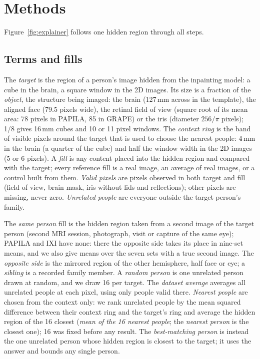 \section{Methods}
\label{sec:methods}

Figure~\ref{fig:explainer} follows one hidden region through all steps.

\subsection{Terms and fills}
\label{sec:ladder}
\label{sec:controls}
The \emph{target} is the region of a person's image hidden from the inpainting model: a cube in the brain, a square window in the 2D images.
Its size is a fraction of the \emph{object}, the structure being imaged: the brain (127\,mm across in the template), the aligned face (79.5 pixels wide), the retinal field of view (square root of its mean area: 78 pixels in PAPILA, 85 in GRAPE) or the iris (diameter $256/\pi$ pixels); 1/8 gives 16\,mm cubes and 10 or 11 pixel windows.
The \emph{context ring} is the band of visible pixels around the target that is used to choose the nearest people: 4\,mm in the brain (a quarter of the cube) and half the window width in the 2D images (5 or 6 pixels).
A \emph{fill} is any content placed into the hidden region and compared with the target; every reference fill is a real image, an average of real images, or a control built from them.
\emph{Valid pixels} are pixels observed in both target and fill (field of view, brain mask, iris without lids and reflections); other pixels are missing, never zero.
\emph{Unrelated people} are everyone outside the target person's family.

The \emph{same person} fill is the hidden region taken from a second image of the target person (second \ac{MRI} session, photograph, visit or capture of the same eye); PAPILA and IXI have none: there the opposite side takes its place in nine-set means, and we also give means over the seven sets with a true second image.
The \emph{opposite side} is the mirrored region of the other hemisphere, half face or eye; a \emph{sibling} is a recorded family member.
A \emph{random person} is one unrelated person drawn at random, and we draw 16 per target.
The \emph{dataset average} averages all unrelated people at each pixel, using only people valid there.
\emph{Nearest people} are chosen from the context only: we rank unrelated people by the mean squared difference between their context ring and the target's ring and average the hidden region of the 16 closest (\emph{mean of the 16 nearest people}; the \emph{nearest person} is the closest one); 16 was fixed before any result.
The \emph{best-matching person} is instead the one unrelated person whose hidden region is closest to the target; it uses the answer and bounds any single person.


